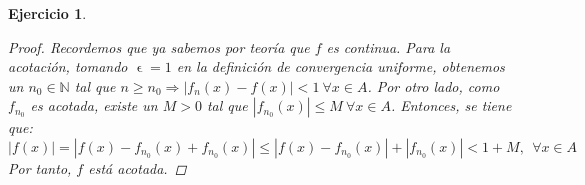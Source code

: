 \documentclass[11pt, a4paper]{article}
\let\epsilon\upvarepsilon
\theoremstyle{theorem-style}
\theoremstyle{definition-style}
\newtheorem{ejer}{Ejercicio}
\theoremstyle{remark-style}
\theoremstyle{example-style}
\begin{document}
\begin{ejer}
\begin{proof}
Recordemos que ya sabemos por teoría que $f$ es continua. Para la acotación, tomando $\epsilon = 1$ en la definición de convergencia uniforme, obtenemos un $n_0 \in \mathbb{N}$ tal que $n \ge n_0 \Rightarrow |f_n(x) - f(x)| < 1\ \forall x \in A$. Por otro lado, como $f_{n_0}$ es acotada, existe un $M>0$ tal que $|f_{n_0}(x)| \le M\ \forall x \in A$. Entonces, se tiene que: $$|f(x)| = |f(x) - f_{n_0}(x) + f_{n_0}(x)| \le |f(x) - f_{n_0}(x)| + |f_{n_0}(x)| < 1 + M, \ \ \forall x \in A$$
Por tanto, $f$ está acotada.
\end{proof}
\end{ejer}
\end{document}
